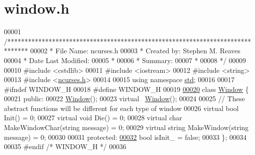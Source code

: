 \hypertarget{window_8h_source}{}\section{window.\+h}

\begin{DoxyCode}
00001 \textcolor{comment}{/******************************************************************************}
00002 \textcolor{comment}{ * File Name: ncurses.h}
00003 \textcolor{comment}{ * Created by: Stephen M. Reaves}
00004 \textcolor{comment}{ * Date Last Modified:}
00005 \textcolor{comment}{ *}
00006 \textcolor{comment}{ * Summary:}
00007 \textcolor{comment}{ *}
00008 \textcolor{comment}{ */}
00009 
00010 \textcolor{preprocessor}{#include <cstdlib>}
00011 \textcolor{preprocessor}{#include <iostream>}
00012 \textcolor{preprocessor}{#include <string>}
00013 \textcolor{preprocessor}{#include <\mbox{\hyperlink{ncurses_8h}{ncurses.h}}>}
00014 
00015 \textcolor{keyword}{using namespace }\mbox{\hyperlink{namespacestd}{std}};
00016 
00017 \textcolor{preprocessor}{#ifndef WINDOW\_H}
00018 \textcolor{preprocessor}{#define WINDOW\_H}
00019 
\mbox{\hyperlink{classWindow}{00020}} \textcolor{keyword}{class }\mbox{\hyperlink{classWindow}{Window}} \{
00021   \textcolor{keyword}{public}:
00022     \mbox{\hyperlink{classWindow}{Window}}();
00023     \textcolor{keyword}{virtual} ~\mbox{\hyperlink{classWindow}{Window}}();
00024 
00025     \textcolor{comment}{// These abstract functions will be different for each type of window}
00026     \textcolor{keyword}{virtual} \textcolor{keywordtype}{bool} Init() = 0;
00027     \textcolor{keyword}{virtual} \textcolor{keywordtype}{void} Die() = 0;
00028     \textcolor{keyword}{virtual} \textcolor{keywordtype}{char} MakeWindowChar(\textcolor{keywordtype}{string} message) = 0;
00029     \textcolor{keyword}{virtual} \textcolor{keywordtype}{string} MakeWindow(\textcolor{keywordtype}{string} message) = 0;
00030 
00031   \textcolor{keyword}{protected}:
\mbox{\hyperlink{classWindow_a06739ea2d178febdb7f0da5f775e5ba8}{00032}}     \textcolor{keywordtype}{bool} isInit\_ = \textcolor{keyword}{false};
00033 \};
00034 
00035 \textcolor{preprocessor}{#endif }\textcolor{comment}{/* WINDOW\_H */}\textcolor{preprocessor}{}
00036 
\end{DoxyCode}
